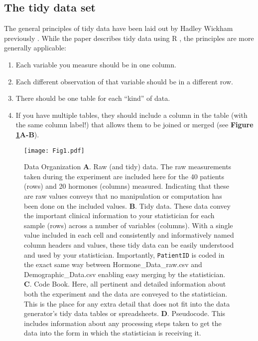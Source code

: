 \documentclass[12pt]{article}
\providecommand{\tightlist}{%
  \setlength{\itemsep}{0pt}\setlength{\parskip}{0pt}}
\begin{document}
\subsection{The tidy data set}\label{the-tidy-data-set}

The general principles of tidy data have been laid out by Hadley Wickham
previously \citep{_tidy_data}. While the paper describes tidy data using
R \citep{_r}, the principles are more generally applicable:

\begin{enumerate}
\def\labelenumi{\arabic{enumi}.}
\tightlist
\item
  Each variable you measure should be in one column.
\item
  Each different observation of that variable should be in a different
  row.
\item
  There should be one table for each ``kind'' of data.
\item
  If you have multiple tables, they should include a column in the table
  (with the same column label!) that allows them to be joined or merged
  (see \textbf{Figure \ref{fig1}A-B}).
\end{enumerate}

\begin{figure}[htbp]
\centering
\texttt{[image: Fig1.pdf]}
\caption{Data Organization \textbf{A}. Raw (and tidy) data. The raw
measurements taken during the experiment are included here for the 40
patients (rows) and 20 hormones (columns) measured. Indicating that
these are raw values conveys that no manipulation or computation has
been done on the included values. \textbf{B}. Tidy data. These data
convey the important clinical information to your statistician for each
sample (rows) across a number of variables (columns). With a single
value included in each cell and consistently and informatively named
column headers and values, these tidy data can be easily understood and
used by your statistician. Importantly, \texttt{PatientID} is coded in
the exact same way between Hormone\_Data\_raw.csv and
Demographic\_Data.csv enabling easy merging by the statistician.
\textbf{C}. Code Book. Here, all pertinent and detailed information
about both the experiment and the data are conveyed to the statistician.
This is the place for any extra detail that does not fit into the data
generator's tidy data tables or spreadsheets. \textbf{D}. Pseudocode.
This includes information about any processing steps taken to get the
data into the form in which the statistician is receiving it.
\label{fig1}}
\end{figure}
\end{document}
